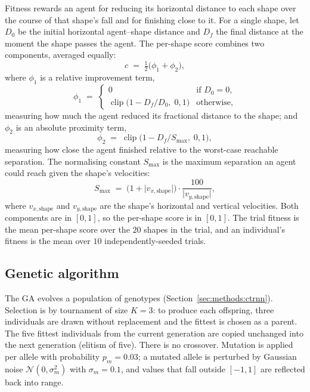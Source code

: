 Fitness rewards an agent for reducing its horizontal distance to each shape over
the course of that shape's fall and for finishing close to it. For a single
shape, let $D_0$ be the initial horizontal agent--shape distance and $D_f$ the
final distance at the moment the shape passes the agent. The per-shape score
combines two components, averaged equally:
%
\begin{equation}
  c \;=\; \tfrac{1}{2}\bigl(\phi_1 + \phi_2\bigr),
  \label{eq:per-shape-score}
\end{equation}
%
where $\phi_1$ is a relative improvement term,
%
\begin{equation}
  \phi_1 \;=\;
  \begin{cases}
    0 & \text{if } D_0 = 0, \\
    \operatorname{clip}\!\bigl(1 - D_f/D_0,\; 0, 1\bigr) & \text{otherwise,}
  \end{cases}
  \label{eq:phi1}
\end{equation}
%
measuring how much the agent reduced its fractional distance to the shape; and
$\phi_2$ is an absolute proximity term,
%
\begin{equation}
  \phi_2 \;=\; \operatorname{clip}\!\bigl(1 - D_f/S_{\max},\; 0, 1\bigr),
  \label{eq:phi2}
\end{equation}
%
measuring how close the agent finished relative to the worst-case reachable
separation. The normalising constant $S_{\max}$ is the maximum separation an
agent could reach given the shape's velocities:
%
\begin{equation}
  S_{\max} \;=\; \bigl(1 + \lvert v_{x,\text{shape}} \rvert\bigr)
  \cdot \frac{100}{\lvert v_{y,\text{shape}} \rvert},
  \label{eq:smax}
\end{equation}
%
where $v_{x,\text{shape}}$ and $v_{y,\text{shape}}$ are the shape's horizontal
and vertical velocities. Both components are in $[0, 1]$, so the per-shape
score is in $[0, 1]$. The trial fitness is the mean per-shape score over the
$20$ shapes in the trial, and an individual's fitness is the mean over $10$
independently-seeded trials.

\subsection{Genetic algorithm}
\label{sec:methods:ga}

The GA evolves a population of genotypes
(Section~\ref{sec:methods:ctrnn}). Selection is by tournament of size $K = 3$:
to produce each offspring, three individuals are drawn without replacement and
the fittest is chosen as a parent. The five fittest individuals from the current
generation are copied unchanged into the next generation (elitism of five). There
is no crossover. Mutation is applied per allele with probability $p_m = 0.03$; a
mutated allele is perturbed by Gaussian noise $\mathcal{N}(0, \sigma_m^2)$ with
$\sigma_m = 0.1$, and values that fall outside $[-1, 1]$ are reflected back into
range.

